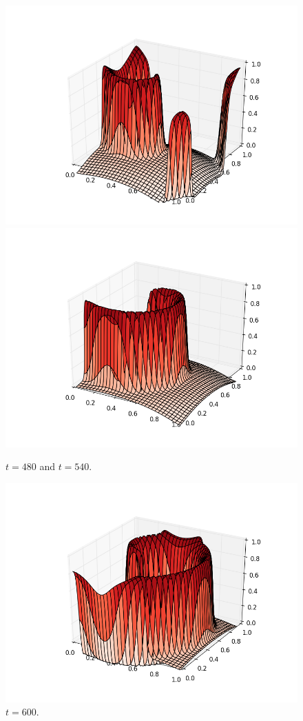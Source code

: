 \documentclass[12pt]{article}
\begin{document}
\begin{figure}[H]
\includegraphics[scale=0.4]{partc_fig_frames/partc_fig17.png}%
\includegraphics[scale=0.4]{partc_fig_frames/partc_fig19.png}
\caption{$t=480$ and $t=540$.}
\end{figure}
\begin{figure}[H]
\centering\includegraphics[scale=0.4]{partc_fig_frames/partc_fig21.png}
\caption{$t=600$.}
\end{figure}
\end{document}
